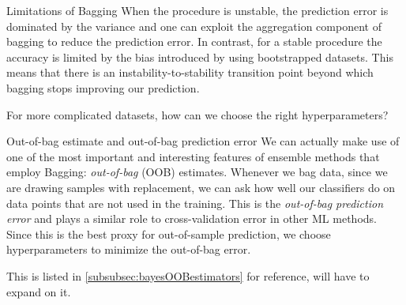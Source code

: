 \begin{mybox}{Limitations of Bagging}
When the procedure is unstable, the prediction error is dominated by the variance and one can exploit the aggregation component of bagging to reduce the prediction error. In contrast, for a stable procedure the accuracy is limited by the bias introduced by using bootstrapped datasets. This means that there is an instability-to-stability transition point beyond which bagging stops improving our prediction.
\end{mybox}
For more complicated datasets, how can we choose the right hyperparameters?
\begin{mybox}{Out-of-bag estimate and out-of-bag prediction error}
We can actually make use of one of the most important and interesting features of ensemble methods that employ Bagging: \emph{out-of-bag} (OOB) estimates. Whenever we bag data, since we are drawing samples with replacement, we can ask how well our classifiers do on data points that are not used in the training. This is the \emph{out-of-bag prediction error} and plays a similar role to cross-validation error in other ML methods. Since this is the best proxy for out-of-sample prediction, we choose hyperparameters to minimize the out-of-bag error.
\end{mybox}
This is listed in \ref{subsubsec:bayesOOBestimators} for reference, will have to expand on it.












